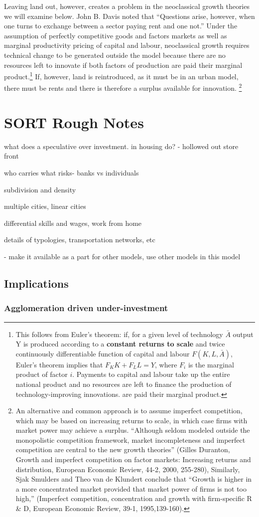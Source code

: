 Leaving land out, however, creates a problem in  the neoclassical growth theories we will examine below. John B. Davis \cite{davisRicardoTheoryProfit1993} noted that ``Questions arise, however, when one turns to exchange between a sector paying rent and one not.'' 
Under the assumption of perfectly competitive goods and factors markets as well as marginal productivity pricing of capital and labour, neoclassical growth requires technical change to be generated outside the model because there are no resources left to innovate if both factors of production are paid their marginal product.\footnote{This follows from Euler's theorem: if, for a given level of technology $\bar A$ output Y is produced according to a \textbf{constant returns to scale} and twice continuously differentiable function of capital and labour $F(K, L, \bar A)$, Euler's theorem implies that $F_K K + F_L L=Y$, where $F_i$ is the marginal product of factor $i$. Payments to  capital and labour take up the entire national product and no resources are left to finance the production of technology-improving innovations. are paid their marginal product.} 
If, however, land is reintroduced, as it must be in an urban model, there must be rents and there is therefore a surplus available for innovation.
\footnote{An alternative and common approach is to assume imperfect competition, which may be based on increasing returns to scale, in which case firms with market power may achieve a surplus. ``Although seldom modeled outside the monopolistic competition framework, market incompleteness and imperfect competition are central to the new growth theories'' (Gilles Duranton, Growth and imperfect competition on factor markets: Increasing returns and distribution, European Economic Review, 44-2, 2000, 255-280), Similarly, Sjak Smulders and Theo van de Klundert conclude that ``Growth is higher in a more concentrated market provided that market power of firms is not too high,'' (Imperfect competition, concentration and growth with firm-specific R \& D, European Economic Review, 39-1, 1995,139-160).}



\section{SORT Rough Notes}
what does a speculative over investment.  in housing  do? - hollowed out store front

who carries what risks- banks vs individuals

subdivision and density

multiple cities,
linear cities

differential skills and wages,
work from home

details of typologies, transportation networks, etc

- make it available as a part for other models, use other models in this model


 

\subsection{Implications}
\subsubsection{Agglomeration driven under-investment}
